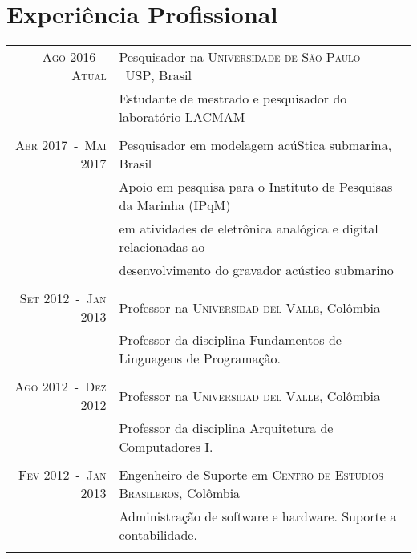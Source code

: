 \documentclass[a4paper,10pt]{article}
\begin{document}
\section{Experiência Profissional}
\begin{tabular}{rl}

    \textsc{Ago 2016~-~Atual}       & Pesquisador na \textsc{Universidade de São Paulo~-~USP}, Brasil \\
                                    &\footnotesize{Estudante de mestrado e pesquisador do laboratório LACMAM} \\
                                    &\\

    \textsc{Abr 2017~-~Mai 2017}    & Pesquisador em modelagem acúStica submarina, Brasil \\
                                    &\footnotesize{Apoio em pesquisa para o Instituto de Pesquisas da Marinha (IPqM)} \\
                                    &\footnotesize{em atividades de eletrônica analógica e digital relacionadas ao} \\
                                    &\footnotesize{desenvolvimento do gravador acústico submarino} \\
                                    &\\

    \textsc{Set 2012~-~Jan 2013}    & Professor na \textsc{Universidad del Valle}, Colômbia \\
                                    &\footnotesize{Professor da disciplina Fundamentos de Linguagens de Programação.} \\
                                    &\\

    \textsc{Ago 2012~-~Dez 2012}    & Professor na \textsc{Universidad del Valle}, Colômbia \\
                                    &\footnotesize{Professor da disciplina Arquitetura de Computadores I.} \\
                                    &\\

    \textsc{Fev 2012~-~Jan 2013}    & Engenheiro de Suporte em \textsc{Centro de Estudios Brasileros}, Colômbia \\
                                    &\footnotesize{Administração de software e hardware. Suporte a contabilidade.} \\
                                    &\\

\end{tabular}
\end{document}

